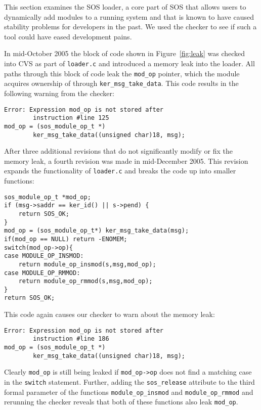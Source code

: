 This section examines the SOS loader, a core part of SOS that allows
users to dynamically add modules to a running system and that is
known to have caused stability problems for developers in the past.
We used the checker to see if such a tool could have eased development
pains.

In mid-October 2005 the block of code shown in Figure~\ref{fig:leak}
was checked into CVS as part of {\tt loader.c} and introduced a memory
leak into the loader.  All paths through this block of code leak the
{\tt mod\_op} pointer, which the module acquires ownership of through
{\tt ker\_msg\_take\_data}.  This code results in the following
warning from the checker:

\begin{scriptsize}
\begin{verbatim}
Error: Expression mod_op is not stored after 
        instruction #line 125
mod_op = (sos_module_op_t *)
        ker_msg_take_data((unsigned char)18, msg);
\end{verbatim}
\end{scriptsize}

After three additional revisions that do not significantly modify or
fix the memory leak, a fourth revision was made in mid-December 2005.
This revision expands the functionality of {\tt loader.c} and breaks
the code up into smaller functions:

\begin{scriptsize}
\begin{verbatim}
sos_module_op_t *mod_op;
if (msg->saddr == ker_id() || s->pend) {
    return SOS_OK;
}
mod_op = (sos_module_op_t*) ker_msg_take_data(msg);
if(mod_op == NULL) return -ENOMEM;
switch(mod_op->op){
case MODULE_OP_INSMOD:
    return module_op_insmod(s,msg,mod_op);
case MODULE_OP_RMMOD:
    return module_op_rmmod(s,msg,mod_op);
}
return SOS_OK;
\end{verbatim}
\end{scriptsize}

This code again causes our checker to warn about the memory leak:

\begin{scriptsize}
\begin{verbatim}
Error: Expression mod_op is not stored after 
        instruction #line 186
mod_op = (sos_module_op_t *)
        ker_msg_take_data((unsigned char)18, msg);
\end{verbatim}
\end{scriptsize}

Clearly {\tt mod\_op} is still being leaked if {\tt mod\_op->op} does
not find a matching case in the {\tt switch} statement.  Further,
adding the {\tt sos\_release} attribute to the third formal parameter
of the functions {\tt module\_op\_insmod} and {\tt module\_op\_rmmod}
and rerunning the checker reveals that both of these functions also
leak {\tt mod\_op}.

